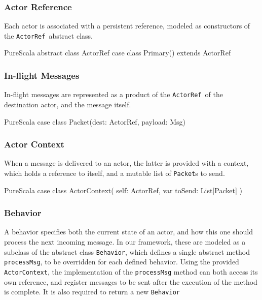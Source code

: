 \documentclass[a4paper,twoside]{article}
\newcommand{\InlineS}[1]{\lstinline[language=PureScala,basicstyle=\small\ttfamily,columns=fixed]|#1|}
\newcommand{\ActorRef}{\InlineS{ActorRef}\ }
\begin{document}
\vspace{-15pt}
\subsubsection*{Actor Reference}

Each actor is associated with a persistent reference, modeled as constructors of the \ActorRef abstract class.

\begin{ShortCode}{PureScala}
abstract class ActorRef
case class Primary() extends ActorRef
\end{ShortCode}

\vspace{-15pt}
\subsubsection*{In-flight Messages}

In-flight messages are represented as a product of the \ActorRef of the destination actor, and the message itself.

\begin{ShortCode}{PureScala}
case class Packet(dest: ActorRef, payload: Msg)
\end{ShortCode}

\vspace{-15pt}
\subsubsection*{Actor Context}

When a message is delivered to an actor, the latter is provided with a context,
which holds a reference to itself, and a mutable list of \InlineS{Packet}s to send.

\begin{ShortCode}{PureScala}
case class ActorContext(
  self: ActorRef,
  var toSend: List[Packet]
)
\end{ShortCode}

\vspace{-15pt}
\subsubsection*{Behavior}

A behavior specifies both the current state of an actor, and how this one should 
process the next incoming message. In our framework, these are modeled as a subclass 
of the abstract class \InlineS{Behavior}, which defines a single abstract method 
\InlineS{processMsg}, to be overridden for each defined behavior. Using the provided \InlineS{ActorContext}, the implementation of the \InlineS{processMsg}
method can both access its own reference, and register messages to be sent after the
execution of the method is complete. It is also required to return a new \InlineS{Behavior}
\end{document}
